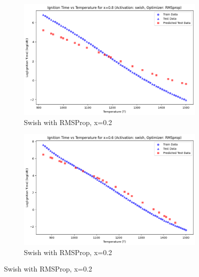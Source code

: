 \documentclass[12pt]{report}
\begin{document}
\begin{figure}[H]
    \centering
    \begin{subfigure}[t]{0.48\textwidth}
        \centering
        \includegraphics[width=\textwidth, keepaspectratio]{swish_rms_08.png}
        \caption{Swish with RMSProp, x=0.2}
    \end{subfigure}
    \hfill
    \begin{subfigure}[t]{0.48\textwidth}
        \centering
        \includegraphics[width=\textwidth, keepaspectratio]{swish_rms_06.png}
        \caption{Swish with RMSProp, x=0.2}
    \end{subfigure}
\end{figure}
\end{document}
